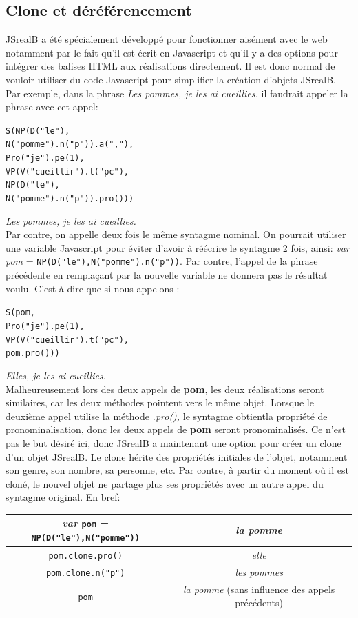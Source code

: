 \documentclass[11pt]{article} %
\newcommand{\system}[1]{\textsf{#1}}
\newcommand{\JSB}{\system{JSrealB}}
\newcommand{\real}[1]{\emph{#1}}
\begin{document}
\subsection{Clone et déréférencement}
\label{clone}
\JSB{} a été spécialement développé pour fonctionner aisément avec
le web notamment par le fait qu'il est écrit en Javascript et qu'il
y a des options pour intégrer des balises HTML aux réalisations directement.
Il est donc normal de vouloir utiliser du code Javascript pour simplifier
la création d'objets \JSB{}. Par exemple, dans la phrase \emph{Les
pommes, je les ai cueillies. }il faudrait appeler la phrase avec cet
appel:
\begin{alltt}
S(NP(D("le"),
     N("pomme").n("p")).a(","),
  Pro("je").pe(1),
  VP(V("cueillir").t("pc"),
     NP(D("le"),
        N("pomme").n("p")).pro()))
\end{alltt}
\real{Les pommes, je les ai cueillies.} \\
Par contre, on appelle deux fois le même syntagme nominal. On pourrait
utiliser une variable Javascript pour éviter d'avoir à réécrire le
syntagme 2 fois, ainsi: \emph{var pom} = \texttt{NP(D("le"),N("pomme").n("p"))}. Par contre, l'appel de la phrase précédente en remplaçant par la
nouvelle variable ne donnera pas le résultat voulu. C'est-à-dire que
si nous appelons : 
\begin{alltt}
S(pom,
  Pro("je").pe(1),
  VP(V("cueillir").t("pc"),
     pom.pro()))
\end{alltt}
\real{Elles, je les ai cueillies.}\\
Malheureusement lors des deux appels de \textbf{pom}, les deux réalisations
seront similaires, car les deux méthodes pointent vers le même objet.
Lorsque le deuxième appel utilise la méthode \emph{.pro(),} le syntagme
obtientla propriété de pronominalisation, donc les deux appels de
\textbf{pom} seront pronominalisés. Ce n'est pas le but désiré ici,
donc \JSB{} a maintenant une option pour créer un clone d'un objet
\JSB{}. Le clone hérite des propriétés initiales de l'objet, notamment
son genre, son nombre, sa personne, etc. Par contre, à partir du moment
où il est cloné, le nouvel objet ne partage plus ses propriétés avec
un autre appel du syntagme original. En bref: \\
\begin{tabular}{|c|c|}
\hline 
\emph{var} \texttt{pom} = \texttt{NP(D("le"),N("pomme"))} & \real{la pomme}\\
\hline 
\hline 
\texttt{pom.clone.pro()} & \real{elle}\\
\hline 
\texttt{pom.clone.n("p")} & \real{les pommes}\\
\hline 
\texttt{pom} & \real{la pomme} {\small{}(sans influence des appels
précédents)}\\
\hline 
\end{tabular} 
\end{document}
